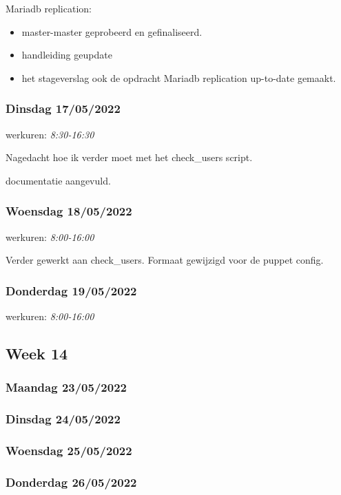 Mariadb replication:

\begin{itemize}
	\item master-master geprobeerd en gefinaliseerd.
	\item handleiding geupdate
	\item het stageverslag ook de opdracht Mariadb replication up-to-date gemaakt.
\end{itemize}

\subsubsection{Dinsdag 17/05/2022}

werkuren: \emph{8:30-16:30}

Nagedacht hoe ik verder moet met het check\_users script.

documentatie aangevuld.

\subsubsection{Woensdag 18/05/2022}

werkuren: \emph{8:00-16:00}

Verder gewerkt aan check\_users. Formaat gewijzigd voor de puppet config.

\subsubsection{Donderdag 19/05/2022}

werkuren: \emph{8:00-16:00}

\subsection{Week 14}

\subsubsection{Maandag 23/05/2022}

\subsubsection{Dinsdag 24/05/2022}

\subsubsection{Woensdag 25/05/2022}

\subsubsection{Donderdag 26/05/2022}